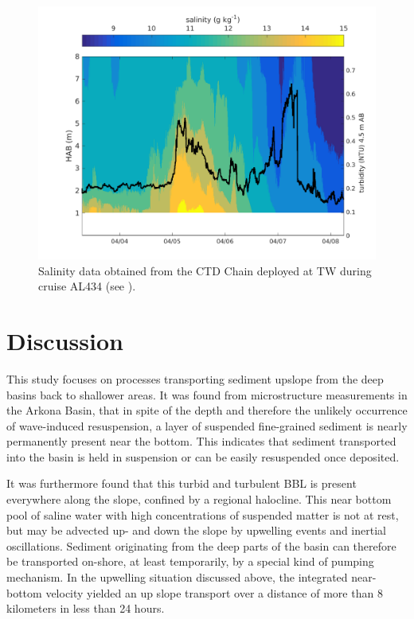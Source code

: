  \begin{figure}[ht]
\includegraphics[width=15cm]{bilder/ctdchaintw.png}
 \caption{Salinity data obtained from the CTD Chain deployed at TW 
during cruise AL434 (see ).}
 \label{ctdchain}
 \end{figure}

\FloatBarrier
\section{Discussion}

This study focuses on processes transporting sediment upslope 
from the deep basins back to shallower areas. It was found from 
microstructure measurements in the Arkona Basin, that in spite of the depth and 
therefore the unlikely occurrence of wave-induced resuspension, a layer of 
suspended fine-grained sediment is nearly permanently present near the bottom. 
This indicates that sediment transported into the basin is held in 
suspension or can be easily resuspended once deposited.

It was furthermore found that this turbid and turbulent BBL is present 
everywhere 
along the slope, confined by a regional halocline. This near bottom pool of 
saline water with high concentrations of suspended matter is not at rest, but 
may be advected up- and down the slope by upwelling events and inertial 
oscillations. 
Sediment originating from the deep parts of the basin can therefore be 
transported on-shore, at least temporarily, by a special kind of pumping 
mechanism. In the upwelling situation 
discussed above, the integrated near-bottom velocity yielded an up slope 
transport over a distance of more than 8 kilometers in less than 24 hours. 

